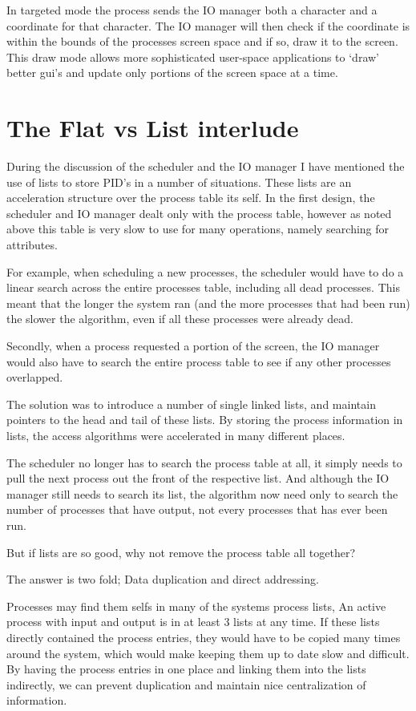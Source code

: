 \documentclass[a4paper]{report}
\begin{document}
In targeted mode the process sends the IO manager both a character and a coordinate for that character. The IO manager will then check if the coordinate is within the bounds of the processes screen space and if so, draw it to the screen. This draw mode allows more sophisticated user-space applications to `draw' better gui's and update only portions of the screen space at a time.

\clearpage
\section{The Flat vs List interlude}

During the discussion of the scheduler and the IO manager I have mentioned the use of lists to store PID's in a number of situations. These lists are an acceleration structure over the process table its self. In the first design, the scheduler and IO manager dealt only with the process table, however as noted above this table is very slow to use for many operations, namely searching for attributes.

For example, when scheduling a new processes, the scheduler would have to do a linear search across the entire processes table, including all dead processes. This meant that the longer the system ran (and the more processes that had been run) the slower the algorithm, even if all these processes were already dead.

Secondly, when a process requested a portion of the screen, the IO manager would also have to search the entire process table to see if any other processes overlapped.

The solution was to introduce a number of single linked lists, and maintain pointers to the head and tail of these lists. By storing the process information in lists, the access algorithms were accelerated in many different places.

The scheduler no longer has to search the process table at all, it simply needs to pull the next process out the front of the respective list. And although the IO manager still needs to search its list, the algorithm now need only to search the number of processes that have output, not every processes that has ever been run.

But if lists are so good, why not remove the process table all together?

The answer is two fold; Data duplication and direct addressing.

Processes may find them selfs in many of the systems process lists, An active process with input and output is in at least 3 lists at any time. If these lists directly contained the process entries, they would have to be copied many times around the system, which would make keeping them up to date slow and difficult. By having the process entries in one place and linking them into the lists indirectly, we can prevent duplication and maintain nice centralization of information.
\end{document}
